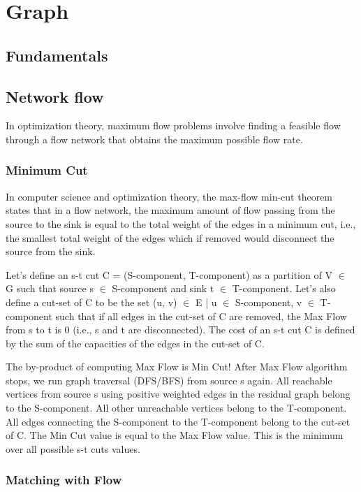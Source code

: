 \chapter{Graph}

\section{Fundamentals}

\section{Network flow}

	In optimization theory, maximum flow problems involve finding a 
	feasible flow through a flow network that obtains the maximum possible flow rate. 


	\subsection{Minimum Cut}

	In computer science and optimization theory, the max-flow min-cut theorem states that in a flow network, 
	the maximum amount of flow passing from the source to the sink is equal to the total weight of the edges 
	in a minimum cut, i.e., the smallest total weight of the edges which if removed would disconnect the source from the sink. 

	Let’s define an s-t cut C = (S-component, T-component) as a partition of V $\in$ G such that 
	source s $\in$ S-component and sink t $\in$ T-component. Let’s also define a cut-set of C to be the set 
	{(u, v) $\in$ E | u $\in$ S-component, v $\in$ T-component} such that if all edges in the cut-set of C are removed,
	the Max Flow from s to t is 0 (i.e., s and t are disconnected). The cost of an s-t cut C is defined by the sum
	of the capacities of the edges in the cut-set of C.

	The by-product of computing Max Flow is Min Cut! After Max Flow algorithm stops, we run graph traversal (DFS/BFS)
	from source s again. All reachable vertices from source s using positive weighted edges in the residual graph belong
	to the S-component. All other unreachable vertices belong to the T-component. All edges connecting the S-component to
	the T-component belong to the cut-set of C. The Min Cut value is equal to the Max Flow value.
	This is the minimum over all possible s-t cuts values.

	\subsection{Matching with Flow}

